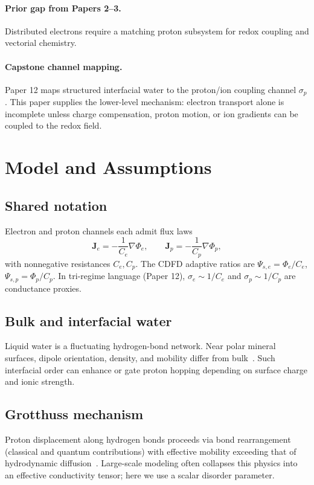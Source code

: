 \documentclass[11pt,a4paper]{article}
\begin{document}
\paragraph{Prior gap from Papers 2--3.}
Distributed electrons require a matching proton subsystem for redox coupling and vectorial chemistry.

\paragraph{Capstone channel mapping.}
Paper 12 maps structured interfacial water to the proton/ion coupling channel $\sigma_p$. This paper supplies the lower-level mechanism: electron transport alone is incomplete unless charge compensation, proton motion, or ion gradients can be coupled to the redox field.

\section{Model and Assumptions}

\subsection{Shared notation}
Electron and proton channels each admit flux laws
\begin{equation}
\bm{J}_e = -\frac{1}{C_e}\nabla\Phi_e,\qquad
\bm{J}_p = -\frac{1}{C_p}\nabla\Phi_p,
\end{equation}
with nonnegative resistances $C_e,C_p$. The CDFD adaptive ratios are $\Psi_{s,e}=\Phi_e/C_e$, $\Psi_{s,p}=\Phi_p/C_p$. In tri-regime language (Paper 12), $\sigma_e\sim 1/C_e$ and $\sigma_p\sim 1/C_p$ are conductance proxies.

\subsection{Bulk and interfacial water}
Liquid water is a fluctuating hydrogen-bond network. Near polar mineral surfaces, dipole orientation, density, and mobility differ from bulk~\cite{Fenter2004}. Such interfacial order can enhance or gate proton hopping depending on surface charge and ionic strength.

\subsection{Grotthuss mechanism}
Proton displacement along hydrogen bonds proceeds via bond rearrangement (classical and quantum contributions) with effective mobility exceeding that of hydrodynamic diffusion~\cite{Agmon1995}. Large-scale modeling often collapses this physics into an effective conductivity tensor; here we use a scalar disorder parameter.
\end{document}
